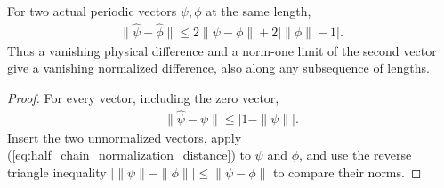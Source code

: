 \begin{lemma}
    \label{lem:half_chain_normalized_physical_remainder}
    \leanok
    For two actual periodic vectors $\psi,\phi$ at the same length,
    \begin{align}
        \|\widehat\psi-\widehat\phi\|
        \le2\|\psi-\phi\|+2\bigl|\|\phi\|-1\bigr|.
    \end{align}
    Thus a vanishing physical difference and a norm-one limit of the
    second vector give a vanishing normalized difference, also along
    any subsequence of lengths.
\end{lemma}
\begin{proof}
    \leanok
    For every vector, including the zero vector,
    \begin{align}
        \|\widehat\psi-\psi\|\le\bigl|1-\|\psi\|\bigr|.
        \label{eq:half_chain_normalization_distance}
    \end{align}
    Insert the two unnormalized vectors, apply
    (\ref{eq:half_chain_normalization_distance}) to $\psi$ and $\phi$,
    and use the reverse triangle inequality
    $\bigl|\|\psi\|-\|\phi\|\bigr|\le\|\psi-\phi\|$ to compare their norms.
\end{proof}

